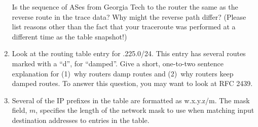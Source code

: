 \documentclass[11pt]{article}
\begin{document}
\begin{enumerate}
\begin{list}{()}{}
  Is the sequence of ASes from Georgia Tech to the router the same as the
  reverse route in the trace data?   Why might the reverse path differ?
  (Please list reasons other than the fact that your traceroute was
  performed at a different time as the table snapshot!)


\end{list}

\item Look at the routing table entry for {.225.0/24}. This
 entry has several routes marked with a ``d'', for ``damped''.  Give a
 short, one-to-two sentence explanation for (1)~why routers damp routes
 and (2)~why routers keep damped routes.  To answer this question, you
 may want to look at RFC 2439.

\item Several of the IP prefixes in the table are formatted as
{\sf w.x.y.z/m}.  The mask field, $m$, specifies the length of the network
mask to use when matching input destination addresses to entries in
the table.  


\end{enumerate}
\end{document}
